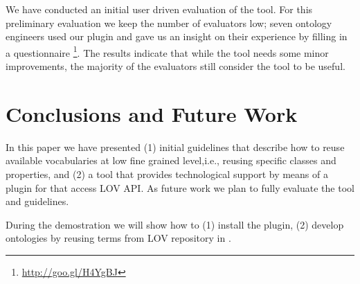We have conducted an initial user driven evaluation of the tool. For this preliminary evaluation we keep the number of evaluators low; seven ontology engineers used our plugin and gave us an insight on their experience by filling in a questionnaire \footnote{\url{http://goo.gl/H4YgBJ}}. The results indicate that while the tool needs some minor improvements, the majority of the evaluators still consider the tool to be useful.

\vspace{-3mm}
\section{Conclusions and Future Work}\label{sec:conclusions}
In this paper we have presented (1) initial guidelines that describe how to reuse available vocabularies at low fine grained level,i.e., reusing specific classes and properties, and (2) a tool that provides technological support by means of a plugin for \protege that access LOV API. As future work we plan to fully evaluate the tool and guidelines.

During the demostration we will show how to (1) install the plugin, (2) develop ontologies by reusing terms from LOV repository in \protege.

